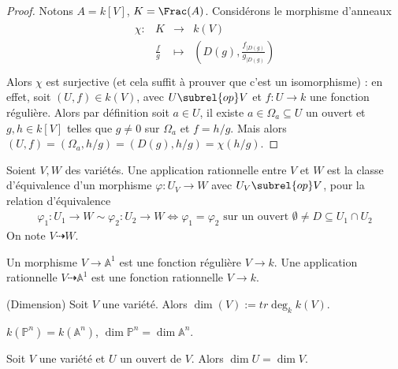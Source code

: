             \begin{proof}
                Notons $A = k[V]$, $K = \Frac (A)$. Considérons le morphisme d'anneaux
                \begin{align*}
                    \begin{array}{cccc}
                        \chi : & K & \to & k(V) \\
                        & \frac fg & \mapsto & (D(g), \frac{f_{|D(g)}}{g_{|D(g)}}) \\
                    \end{array}
                \end{align*}
                Alors $\chi$ est surjective (et cela suffit à prouver que c'est un isomorphisme) : en effet, soit $(U,f) \in k(V)$, avec $U \subrel{op} V$ et $f : U \to k$ une fonction régulière. Alors par définition soit $a \in U$, il existe $a \in \Omega_a \subseteq U$ un ouvert et $g,h \in k[V]$ telles que $g \neq 0$ sur $\Omega_a$ et $f = h/g$. Mais alors $(U,f) = (\Omega_a, h/g) = (D(g), h/g) = \chi(h/g)$.
            \end{proof}
            \begin{defi}
                Soient $V,W$ des variétés. Une application rationnelle entre $V$ et $W$ est la classe d'équivalence d'un morphisme $\varphi : U_V \to W$ avec $U_V \subrel{op} V$, pour la relation d'équivalence 
                \begin{align*}
                    \varphi_1 : U_1 \to W \sim \varphi_2 : U_2 \to W \iff \varphi_1 = \varphi_2 \text{ sur un ouvert } \emptyset \neq D \subseteq U_1 \cap U_2
                \end{align*}
                On note $V \dashrightarrow W$.
            \end{defi}
            \begin{remq}
                Un morphisme $V \to \mathbb{A}^1$ est une fonction régulière $V \to k$. Une application rationnelle $V \dashrightarrow \mathbb{A}^1$ est une fonction rationnelle $V \to k$.
            \end{remq}
            \begin{defi} (Dimension)
                Soit $V$ une variété. Alors $\dim(V) := tr\deg_k k(V)$.
            \end{defi}
            \begin{expl}
                $k(\mathbb{P}^n) = k(\mathbb{A}^n)$, $\dim \mathbb{P}^n = \dim \mathbb{A}^n$.
            \end{expl}
            \begin{remq}
                Soit $V$ une variété et $U$ un ouvert de $V$. Alors $\dim U = \dim V$.
            \end{remq}
